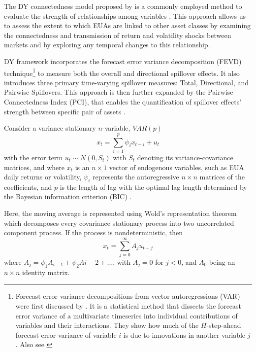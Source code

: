 \documentclass[preprint, 3p,
authoryear]{elsarticle} %
\begin{document}
The DY connectedness model proposed by
\citet{diebold_measuring_2009, diebold_better_2012, diebold_network_2014}
is a commonly employed method to evaluate the strength of relationships
among variables
\citep{zhang_dynamic_2016, xia_asymmetric_2019, ji_information_2019, tan_how_2020, gabauer_dynamic_2021, hanif_nonlinear_2021, diebold_past_2023, dong_risk_2024, gong_physical_2024}.
This approach allows us to assess the extent to which EUAs are linked to
other asset classes by examining the connectedness and transmission of
return and volatility shocks between markets and by exploring any
temporal changes to this relationship.

DY framework incorporates the forecast error variance decomposition
(FEVD)
technique\footnote{Forecast error variance decompositions from vector autoregressions (VAR) were first discussed by \citet{sims_macroeconomics_1980}. It is a statistical method that dissects the forecast error variance of a multivariate timeseries into individual contributions of variables and their interactions. They show how much of the $H$-step-ahead forecast error variance of variable $i$ is due to innovations in another variable $j$. Also see \citet{diebold_better_2012}}
to measure both the overall and directional spillover effects. It also
introduces three primary time-varying spillover measures: Total,
Directional, and Pairwise Spillovers. This approach is then further
expanded by the Pairwise Connectedness Index (PCI), that enables the
quantification of spillover effects' strength between specific pair of
assets \citep{gabauer_dynamic_2021}.

Consider a variance stationary \(n\)-variable, \(VAR(p)\)
\begin{equation}
x_t = \sum_{i=1}^p\psi_ix_{t-i}+u_t
\end{equation} with the error term \(u_t \sim N(0,S_t)\) with \(S_t\)
denoting its variance-covariance matrices, and where \(x_t\) is an
\(n \times 1\) vector of endogenous variables, such as EUA daily returns
or volatility, \(\psi_i\) represents the autoregressive \(n \times n\)
matrices of the coefficients, and \(p\) is the length of lag with the
optimal lag length determined by the Bayesian information criterion
(BIC) \citep{diebold_better_2012, pham_impact_2023}.

Here, the moving average is represented using Wold's representation
theorem \citep{wold_study_1939} which decomposes every covariance
stationary process into two uncorrelated component process. If the
process is nondeterministic, then \begin{equation}
x_t = \sum_{j=0}^\infty A_ju_{t-j}
\end{equation} where \(A_j = \psi_1A_{i-1}+\psi_2A{i-2}+\dots\), with
\(A_j=0\) for \(j<0\), and \(A_0\) being an \(n \times n\) identity
matrix.
\end{document}
